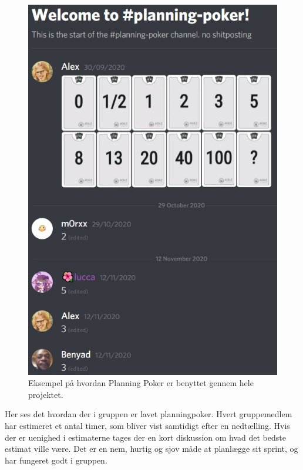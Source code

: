 \begin{figure}
    \includegraphics[width=\linewidth,scale=0.5]{figures/planningpoker.jpg}
    \caption{Eksempel på hvordan Planning Poker er benyttet gennem hele projektet.}
    \label{fig:Poker}
\end{figure}
Her ses det hvordan der i gruppen er lavet planningpoker. Hvert gruppemedlem har estimeret et antal timer, som bliver vist samtidigt efter en nedtælling. Hvis der er uenighed i estimaterne tages der en kort diskussion om hvad det bedste estimat ville være. Det er en nem, hurtig og sjov måde at planlægge sit sprint, og har fungeret godt i gruppen.